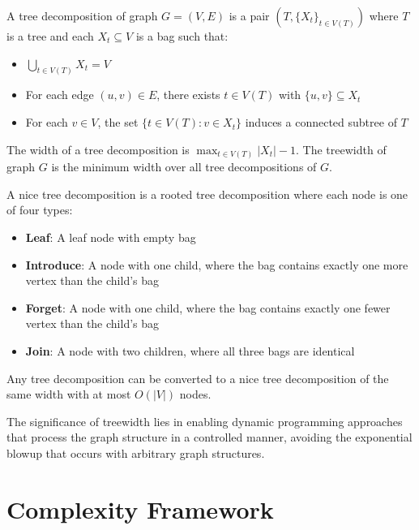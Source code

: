 \begin{definition}
A tree decomposition of graph $G = (V, E)$ is a pair $(T, \{X_t\}_{t \in V(T)})$ where $T$ is a tree and each $X_t \subseteq V$ is a bag such that:
\begin{itemize}
\item $\bigcup_{t \in V(T)} X_t = V$
\item For each edge $(u,v) \in E$, there exists $t \in V(T)$ with $\{u,v\} \subseteq X_t$
\item For each $v \in V$, the set $\{t \in V(T) : v \in X_t\}$ induces a connected subtree of $T$
\end{itemize}
\end{definition}

\begin{definition}[Treewidth]
The width of a tree decomposition is $\max_{t \in V(T)} |X_t| - 1$. The treewidth of graph $G$ is the minimum width over all tree decompositions of $G$.
\end{definition}

\begin{definition}
A nice tree decomposition is a rooted tree decomposition where each node is one of four types:
\begin{itemize}
\item \textbf{Leaf}: A leaf node with empty bag
\item \textbf{Introduce}: A node with one child, where the bag contains exactly one more vertex than the child's bag
\item \textbf{Forget}: A node with one child, where the bag contains exactly one fewer vertex than the child's bag  
\item \textbf{Join}: A node with two children, where all three bags are identical
\end{itemize}
\end{definition}

Any tree decomposition can be converted to a nice tree decomposition of the same width with at most $O(|V|)$ nodes.

The significance of treewidth lies in enabling dynamic programming approaches that process the graph structure in a controlled manner, avoiding the exponential blowup that occurs with arbitrary graph structures.

\section{Complexity Framework}

